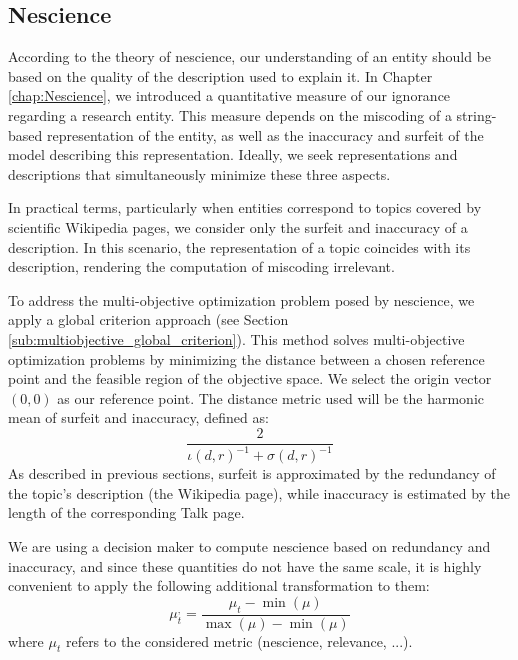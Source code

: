 \subsection{Nescience}

According to the theory of nescience, our understanding of an entity should be based on the quality of the description used to explain it. In Chapter \ref{chap:Nescience}, we introduced a quantitative measure of our ignorance regarding a research entity. This measure depends on the miscoding of a string-based representation of the entity, as well as the inaccuracy and surfeit of the model describing this representation. Ideally, we seek representations and descriptions that simultaneously minimize these three aspects.

In practical terms, particularly when entities correspond to topics covered by scientific Wikipedia pages, we consider only the surfeit and inaccuracy of a description. In this scenario, the representation of a topic coincides with its description, rendering the computation of miscoding irrelevant.

To address the multi-objective optimization problem posed by nescience, we apply a global criterion approach (see Section \ref{sub:multiobjective_global_criterion}). This method solves multi-objective optimization problems by minimizing the distance between a chosen reference point and the feasible region of the objective space. We select the origin vector $(0, 0)$ as our reference point. The distance metric used will be the harmonic mean of surfeit and inaccuracy, defined as:
\[
\frac{2}{ \iota(d, r)^{-1} + \sigma(d, r)^{-1} }
\]
As described in previous sections, surfeit is approximated by the redundancy of the topic's description (the Wikipedia page), while inaccuracy is estimated by the length of the corresponding Talk page.

We are using a decision maker to compute nescience based on redundancy and inaccuracy, and since these quantities do not have the same scale, it is highly convenient to apply the following additional transformation to them:
\[
\mu_{t}^{,}=\frac{\mu_{t}-\min(\mu)}{\max(\mu)-\min(\mu)}
\]
where $\mu_t$ refers to the considered metric (nescience, relevance, ...). 

